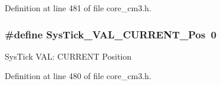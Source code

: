 \-Definition at line 481 of file core\-\_\-cm3.\-h.

\hypertarget{group___c_m_s_i_s___sys_tick_ga3208104c3b019b5de35ae8c21d5c34dd}{
\subsubsection[{\-Sys\-Tick\-\_\-\-V\-A\-L\-\_\-\-C\-U\-R\-R\-E\-N\-T\-\_\-\-Pos}]{\setlength{\rightskip}{0pt plus 5cm}\#define {\bf \-Sys\-Tick\-\_\-\-V\-A\-L\-\_\-\-C\-U\-R\-R\-E\-N\-T\-\_\-\-Pos}~0}}\label{group___c_m_s_i_s___sys_tick_ga3208104c3b019b5de35ae8c21d5c34dd}
\-Sys\-Tick \-V\-A\-L\-: \-C\-U\-R\-R\-E\-N\-T \-Position 

\-Definition at line 480 of file core\-\_\-cm3.\-h.

